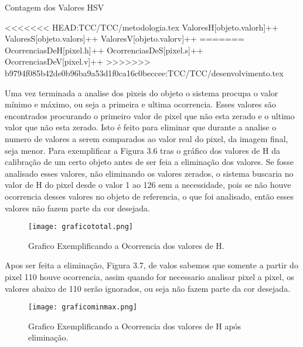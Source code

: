 	        \begin{algorithm}
	       		 \caption{Contagem dos Valores HSV}
		        \begin{algorithmic}
		     	
<<<<<<< HEAD:TCC/TCC/metodologia.tex
		   		 \State ValoresH[objeto.valorh]++ 
		    	 \State	ValoresS[objeto.valors]++ 
		     	 \State	ValoresV[objeto.valorv]++
=======
		   				 \State OcorrenciasDeH[pixel.h]++ 
		    			 \State	OcorrenciasDeS[pixel.s]++ 
		     	  		 \State	OcorrenciasDeV[pixel.v]++
		     	   \EndFor
>>>>>>> b9794f085b42de0b96ba9a53d1f0ca16c0beccee:TCC/TCC/desenvolvimento.tex
		     	\EndFor
		     		
		        \end{algorithmic}
	        
	        \end{algorithm}
	        
        
Uma vez terminada a analise dos pixeis do objeto o sistema procupa o valor mínimo e máximo, ou seja a primeira e ultima ocorrencia. Esses valores são encontrados procurando o primeiro valor de pixel que não esta zerado e o ultimo valor que não esta zerado. Isto é feito para eliminar que durante a analise o numero de valores a serem comparados ao valor real do pixel, da imagem final, seja menor. Para exemplificar a Figura 3.6 tras o gráfico dos valores de H da calibração de um certo objeto antes de ser feia a eliminação dos valores. Se fosse analisado esses valores, não eliminando os valores zerados, o sistema buscaria no valor de H do pixel desde o valor 1 ao 126 sem a necessidade, pois se não houve ocorrencia desses valores no objeto de referencia, o que foi analisado, então esses valores não fazem parte da cor desejada.

\begin{figure}[!h]
	\centering
	\texttt{[image: graficototal.png]}
	\caption{Grafico Exemplificando a Ocorrencia dos valores de H.}
	\label{Grafico Exemplo}
\end{figure}

 Apos ser feita a eliminação, Figura 3.7, de valos sabemos que somente a partir do pixel 110 houve ocorrencia, assim quando for necessario analisar pixel a pixel, os valores abaixo de 110 serão ignorados, ou seja não fazem parte da cor desejada.
 \begin{figure}[!h]
 	\centering
 	\texttt{[image: graficominmax.png]}
 	\caption{Grafico Exemplificando a Ocorrencia dos valores de H após eliminação.}
 	\label{Grafico Exemplo}
 \end{figure}

